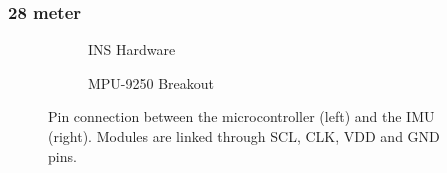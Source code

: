 \subsubsection{28 meter}

\begin{figure}[!h]
    \centering
    
\end{figure}

\begin{figure}[!h]
    \centering
    \begin{subfigure}{0.49\textwidth}
        \centering
        \resizebox{1\linewidth}{!}{}
        \caption{INS Hardware}
        \label{fig:triangle28_2D}
    \end{subfigure}
    \begin{subfigure}{0.49\textwidth}
        \centering
        \resizebox{1\linewidth}{!}{}
        \caption{MPU-9250 Breakout}
        \label{fig:triangle28_3D}
    \end{subfigure}
    \caption{Pin connection between the microcontroller (left) and the IMU (right). Modules are linked through SCL, CLK, VDD and GND pins.}
    \label{fig:triangle28}
\end{figure}




